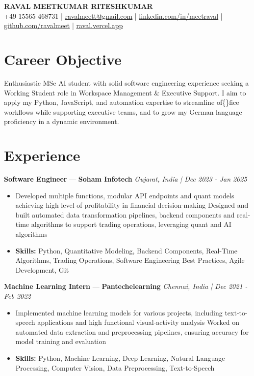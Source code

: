 \documentclass[a4paper,10pt]{article}
\begin{document}
\begin{center}
  {\Large\bfseries RAVAL MEETKUMAR RITESHKUMAR}\\[2pt]
  {\small +49 15565 468731 \;|\; \href{mailto:ravalmeett@gmail.com}{ravalmeett@gmail.com} \;|\; \href{https://www.linkedin.com/in/meetraval/}{linkedin.com/in/meetraval} \;|\; \href{https://github.com/ravalmeet}{github.com/ravalmeet} \;|\; \href{https://raval.vercel.app/}{raval.vercel.app}}
\end{center}
\vspace{-3pt}

\section*{Career Objective}
Enthusiastic MSc AI student with solid software engineering experience seeking a Working Student role in Workspace Management \& Executive Support. I aim to apply my Python, JavaScript, and automation expertise to streamline of\{\}fice workflows while supporting executive teams, and to grow my German language proficiency in a dynamic environment.\par

\section*{Experience}
\textbf{Software Engineer} — \textbf{Soham Infotech} \hfill \textit{Gujarat, India \;|\; Dec 2023 - Jan 2025}\par
\vspace{1pt}
\begin{itemize}
  \item Developed multiple functions, modular API endpoints and quant models achieving high level of profitability in financial decision-making Designed and built automated data transformation pipelines, backend components and real-time algorithms to support trading operations, leveraging quant and AI algorithms
  \item \textbf{Skills:} Python, Quantitative Modeling, Backend Components, Real-Time Algorithms, Trading Operations, Software Engineering Best Practices, Agile Development, Git
\end{itemize}
\vspace{3pt}
\textbf{Machine Learning Intern} — \textbf{Pantechelearning} \hfill \textit{Chennai, India \;|\; Dec 2021 - Feb 2022}\par
\vspace{1pt}
\begin{itemize}
  \item Implemented machine learning models for various projects, including text-to-speech applications and high functional visual-activity analysis Worked on automated data extraction and preprocessing pipelines, ensuring accuracy for model training and evaluation
  \item \textbf{Skills:} Python, Machine Learning, Deep Learning, Natural Language Processing, Computer Vision, Data Preprocessing, Text-to-Speech
\end{itemize}
\end{document}
